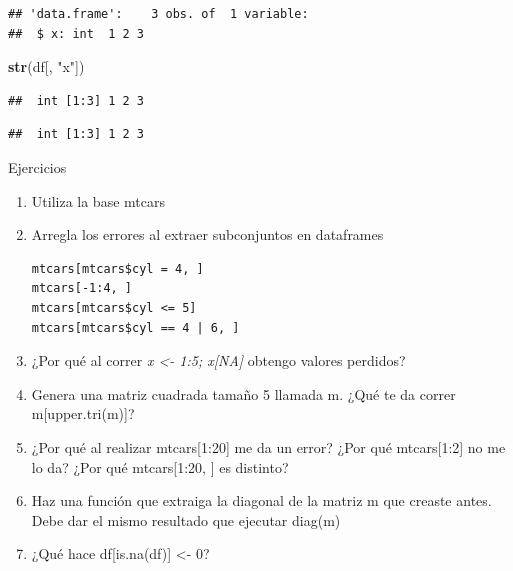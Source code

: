\documentclass[]{article}
\newenvironment{Shaded}{\begin{snugshade}}{\end{snugshade}}
\newcommand{\KeywordTok}[1]{\textcolor[rgb]{0.13,0.29,0.53}{\textbf{{#1}}}}
\newcommand{\StringTok}[1]{\textcolor[rgb]{0.31,0.60,0.02}{{#1}}}
\newcommand{\NormalTok}[1]{{#1}}
\begin{document}
\begin{verbatim}
## 'data.frame':    3 obs. of  1 variable:
##  $ x: int  1 2 3
\end{verbatim}

\begin{Shaded}
\begin{Highlighting}[]
\KeywordTok{str}\NormalTok{(df[, }\StringTok{"x"}\NormalTok{])}
\end{Highlighting}
\end{Shaded}

\begin{verbatim}
##  int [1:3] 1 2 3
\end{verbatim}

\begin{Shaded}
\end{Shaded}

\begin{verbatim}
##  int [1:3] 1 2 3
\end{verbatim}

\renewcommand\bcStyleTitre[1]{\large\textcolor{bbblack}{#1}}

\begin{bclogo}[
  couleur=llred,
  arrondi=0,
  logo=\bcstop,
  barre=none,
  noborder=true]{Ejercicios}
\begin{enumerate}
\item Utiliza la base mtcars
\item{Arregla los errores al extraer subconjuntos en dataframes
\begin{verbatim}
mtcars[mtcars$cyl = 4, ]
mtcars[-1:4, ]
mtcars[mtcars$cyl <= 5]
mtcars[mtcars$cyl == 4 | 6, ]
\end{verbatim}
}
\item ¿Por qué al correr {\it x <- 1:5; x[NA] } obtengo valores perdidos?
\item Genera una matriz cuadrada tamaño 5 llamada m. ¿Qué te da correr m[upper.tri(m)]?
\item ¿Por qué al realizar mtcars[1:20] me da un error? ¿Por qué mtcars[1:2] no me lo da?
¿Por qué mtcars[1:20, ] es distinto?
\item Haz una función que extraiga la diagonal de la matriz m que creaste antes.
Debe dar el mismo resultado que ejecutar diag(m)
\item ¿Qué hace df[is.na(df)] <- 0?
\end{enumerate}
\end{bclogo}
\end{document}
